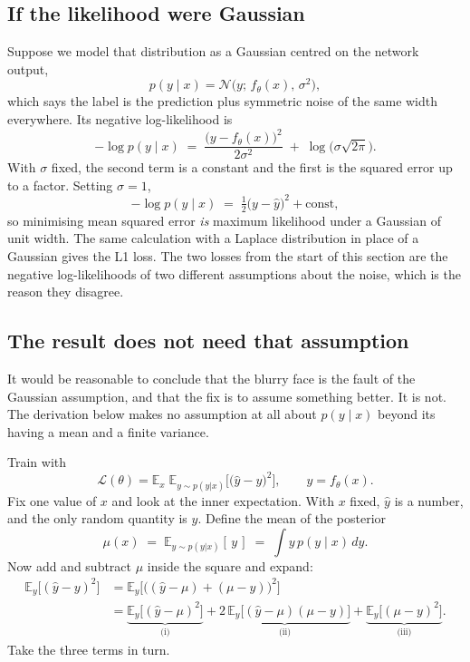 \documentclass[11pt]{article}
\newcommand{\Loss}{\mathcal{L}}
\newcommand{\yhat}{\hat{y}}
\begin{document}
\subsection*{If the likelihood were Gaussian}

Suppose we model that distribution as a Gaussian centred on the network output,
%
\[
  p(y \mid x) = \mathcal{N}\big(y; \, f_\theta(x), \, \sigma^{2}\big),
\]
%
which says the label is the prediction plus symmetric noise of the same width everywhere.
Its negative log-likelihood is
%
\[
  -\log p(y \mid x) \;=\; \frac{\big(y - f_\theta(x)\big)^{2}}{2\sigma^{2}}
                     \;+\; \log\!\big(\sigma\sqrt{2\pi}\big).
\]
%
With $\sigma$ fixed, the second term is a constant and the first is the squared error up to
a factor. Setting $\sigma = 1$,
%
\[
  -\log p(y \mid x) \;=\; \tfrac12 \big(y - \yhat\big)^{2} + \text{const},
\]
%
so minimising mean squared error \emph{is} maximum likelihood under a Gaussian of unit
width. The same calculation with a Laplace distribution in place of a Gaussian gives the L1
loss. The two losses from the start of this section are the negative log-likelihoods of two
different assumptions about the noise, which is the reason they disagree.

\subsection*{The result does not need that assumption}

It would be reasonable to conclude that the blurry face is the fault of the Gaussian
assumption, and that the fix is to assume something better. It is not. The derivation below
makes no assumption at all about $p(y \mid x)$ beyond its having a mean and a finite
variance.

\medskip
\noindent
Train with
%
\[
  \Loss(\theta) = \mathbb{E}_{x}\;
                  \mathbb{E}_{y \sim p(y|x)}\Big[ \big(\yhat - y\big)^{2} \Big],
  \qquad \yhat = f_\theta(x).
\]
%
Fix one value of $x$ and look at the inner expectation. With $x$ fixed, $\yhat$ is a
number, and the only random quantity is $y$. Define the mean of the posterior
%
\[
  \mu(x) \;=\; \mathbb{E}_{y \sim p(y|x)}[\,y\,] \;=\; \int y\, p(y \mid x)\, dy .
\]
%
Now add and subtract $\mu$ inside the square and expand:
%
\begin{align*}
  \mathbb{E}_{y}\big[(\yhat - y)^{2}\big]
  &= \mathbb{E}_{y}\Big[\big((\yhat - \mu) + (\mu - y)\big)^{2}\Big] \\[2pt]
  &= \underbrace{\mathbb{E}_{y}\big[(\yhat - \mu)^{2}\big]}_{\text{(i)}}
   + \underbrace{2\,\mathbb{E}_{y}\big[(\yhat - \mu)(\mu - y)\big]}_{\text{(ii)}}
   + \underbrace{\mathbb{E}_{y}\big[(\mu - y)^{2}\big]}_{\text{(iii)}} .
\end{align*}
%
Take the three terms in turn.
\end{document}
